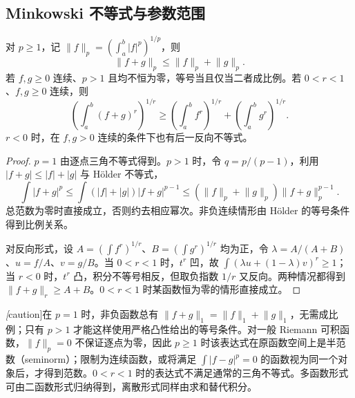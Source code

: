 \subsection{Minkowski 不等式与参数范围}
\begin{theorem}
\label{thm:pei-int-minkowski}
对 $p\ge1$，记 $\lVert f\rVert_p=(\int_a^b|f|^p)^{1/p}$，则
\begin{equation}
 \lVert f+g\rVert_p\le\lVert f\rVert_p+\lVert g\rVert_p.
 \label{eq:pei-int-minkowski}
\end{equation}
若 $f,g\ge0$ 连续、$p>1$ 且均不恒为零，等号当且仅当二者成比例。若 $0<r<1$、$f,g\ge0$ 连续，则
\[
 \left(\int_a^b(f+g)^r\right)^{1/r}
 \ge\left(\int_a^bf^r\right)^{1/r}+\left(\int_a^bg^r\right)^{1/r}.
\]
$r<0$ 时，在 $f,g>0$ 连续的条件下也有后一反向不等式。
\end{theorem}
\begin{proof}
$p=1$ 由逐点三角不等式得到。$p>1$ 时，令 $q=p/(p-1)$，利用 $|f+g|\le|f|+|g|$ 与 Hölder 不等式，
\[
 \int|f+g|^p\le\int(|f|+|g|)|f+g|^{p-1}
 \le(\lVert f\rVert_p+\lVert g\rVert_p)\lVert f+g\rVert_p^{p-1}.
\]
总范数为零时直接成立，否则约去相应幂次。非负连续情形由 Hölder 的等号条件得到比例关系。

对反向形式，设 $A=(\int f^r)^{1/r}$、$B=(\int g^r)^{1/r}$ 均为正，令 $\lambda=A/(A+B)$、$u=f/A$、$v=g/B$。当 $0<r<1$ 时，$t^r$ 凹，故 $\int(\lambda u+(1-\lambda)v)^r\ge1$；当 $r<0$ 时，$t^r$ 凸，积分不等号相反，但取负指数 $1/r$ 又反向。两种情况都得到 $\lVert f+g\rVert_r\ge A+B$。$0<r<1$ 时某函数恒为零的情形直接成立。
\end{proof}
\emph[caution]{在 $p=1$ 时，非负函数总有 $\lVert f+g\rVert_1=\lVert f\rVert_1+\lVert g\rVert_1$，无需成比例}；只有 $p>1$ 才能这样使用严格凸性给出的等号条件。对一般 Riemann 可积函数，$\lVert f\rVert_p=0$ 不保证逐点为零，因此 $p\ge1$ 时该表达式在原函数空间上是半范数（seminorm）；限制为连续函数，或将满足 $\int|f-g|^p=0$ 的函数视为同一个对象后，才得到范数。$0<r<1$ 时的表达式不满足通常的三角不等式。多函数形式可由二函数形式归纳得到，离散形式同样由求和替代积分。

